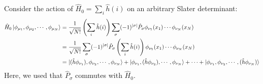 \documentclass{report}
\theoremstyle{plain}
\theoremstyle{definition}
\begin{document}
Consider the action of $\hat{H}_0 = \sum_i \hat{h}(i)$ on an arbitrary
Slater determinant:
\begin{equation}
  \begin{split}
    \hat{H}_0 \ket{\phi_{\mu_1}, \phi_{\mu_2}, \cdots, \phi_{\mu_N}}
    &= \frac{1}{\sqrt{N!}} \left(\sum_i \hat{h}(i)\right) \sum_\sigma (-1)^{|\sigma|}
    \hat{P}_\sigma \phi_{\nu_1}(x_1)\cdots \phi_{\nu_N}(x_N) \\
    &= \frac{1}{\sqrt{N!}} \sum_\sigma (-1)^{|\sigma|}
    \hat{P}_\sigma \left(\sum_i \hat{h}(i)\right)
    \phi_{\nu_1}(x_1)\cdots \phi_{\nu_N}(x_N) \\
    & = \ket{(\hat{h}\phi_{\nu_1}), \phi_{\nu_2},\cdots,\phi_{\nu_N}}
    + \ket{\phi_{\nu_1}, (\hat{h}\phi_{\nu_2}),\cdots,\phi_{\nu_N}} +
    \cdots + \ket{\phi_{\nu_1},\phi_{\nu_2},\cdots,(\hat{h}\phi_{\nu_N})} 
\end{split}
\end{equation}
Here, we used that $\hat{P}_\sigma$ commutes with $\hat{H}_0$.
\end{document}
